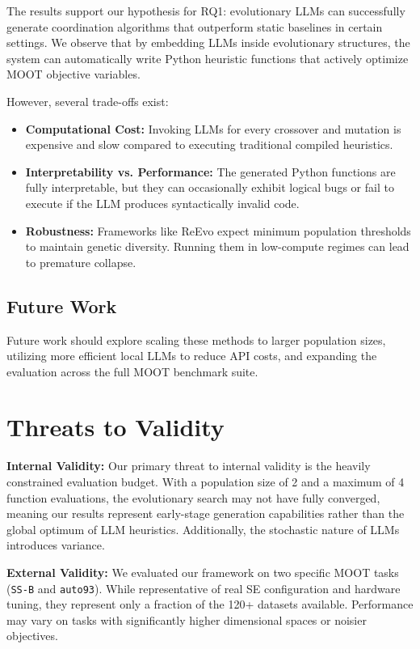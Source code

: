 \documentclass[sigconf,nonacm]{acmart}
\begin{document}
The results support our hypothesis for RQ1: evolutionary LLMs can successfully generate coordination algorithms that outperform static baselines in certain settings. We observe that by embedding LLMs inside evolutionary structures, the system can automatically write Python heuristic functions that actively optimize MOOT objective variables. 

However, several trade-offs exist:
\begin{itemize}
\item \textbf{Computational Cost:} Invoking LLMs for every crossover and mutation is expensive and slow compared to executing traditional compiled heuristics.
\item \textbf{Interpretability vs. Performance:} The generated Python functions are fully interpretable, but they can occasionally exhibit logical bugs or fail to execute if the LLM produces syntactically invalid code.
\item \textbf{Robustness:} Frameworks like ReEvo expect minimum population thresholds to maintain genetic diversity. Running them in low-compute regimes can lead to premature collapse.
\end{itemize}

\subsection{Future Work}
Future work should explore scaling these methods to larger population sizes, utilizing more efficient local LLMs to reduce API costs, and expanding the evaluation across the full MOOT benchmark suite.

\section{Threats to Validity}

\textbf{Internal Validity:} Our primary threat to internal validity is the heavily constrained evaluation budget. With a population size of 2 and a maximum of 4 function evaluations, the evolutionary search may not have fully converged, meaning our results represent early-stage generation capabilities rather than the global optimum of LLM heuristics. Additionally, the stochastic nature of LLMs introduces variance.

\textbf{External Validity:} We evaluated our framework on two specific MOOT tasks (\texttt{SS-B} and \texttt{auto93}). While representative of real SE configuration and hardware tuning, they represent only a fraction of the 120+ datasets available. Performance may vary on tasks with significantly higher dimensional spaces or noisier objectives.
\end{document}

